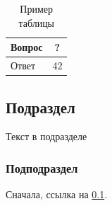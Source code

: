 \documentclass[intlimits,twoside,a4paper,11pt]{article}
\begin{document}
\begin{table}[H]
\centering
\caption{Пример таблицы}
\label{table-example}
\small
\begin{tabular}{|p{5cm}|c|}
	\hline
	\centering
	Вопрос & ? \\
	\hline
	Ответ & 42 \\
	\hline
\end{tabular}
\end{table}

\subsection{Подраздел}
\label{sec:sub} %
Текст в подразделе

\subsubsection{Подподраздел}
Сначала, ссылка на \ref{sec:sub}.
\end{document}
